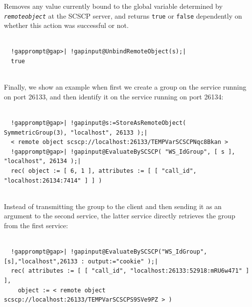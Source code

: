 \documentclass[a4paper,11pt]{report}
\begin{document}
{{{ Removes any value currently bound to the global variable determined by \mbox{\texttt{\mdseries\slshape remoteobject}} at the \textsf{SCSCP} server, and returns \texttt{true} or \texttt{false} dependently on whether this action was successful or not. 
\begin{Verbatim}[commandchars=!@|,fontsize=\small,frame=single,label=Example]
  
  !gapprompt@gap>| !gapinput@UnbindRemoteObject(s);|
  true
  
\end{Verbatim}
 }

 Finally, we show an example when first we create a group on the service
running on port 26133, and then identify it on the service running on port
26134: 
\begin{Verbatim}[commandchars=!@|,fontsize=\small,frame=single,label=Example]
  
  !gapprompt@gap>| !gapinput@s:=StoreAsRemoteObject( SymmetricGroup(3), "localhost", 26133 );|
  < remote object scscp://localhost:26133/TEMPVarSCSCPNqc8Bkan >
  !gapprompt@gap>| !gapinput@EvaluateBySCSCP( "WS_IdGroup", [ s ], "localhost", 26134 );|
  rec( object := [ 6, 1 ], attributes := [ [ "call_id", "localhost:26134:7414" ] ] )
  
\end{Verbatim}
 Instead of transmitting the group to the client and then sending it as an
argument to the second service, the latter service directly retrieves the
group from the first service: 
\begin{Verbatim}[commandchars=!@|,fontsize=\small,frame=single,label=Example]
  
  !gapprompt@gap>| !gapinput@EvaluateBySCSCP("WS_IdGroup",[s],"localhost",26133 : output:="cookie" );|
  rec( attributes := [ [ "call_id", "localhost:26133:52918:mRU6w471" ] ], 
    object := < remote object scscp://localhost:26133/TEMPVarSCSCPS9SVe9PZ > )
  
\end{Verbatim}
 }

 }

 
\end{document}
